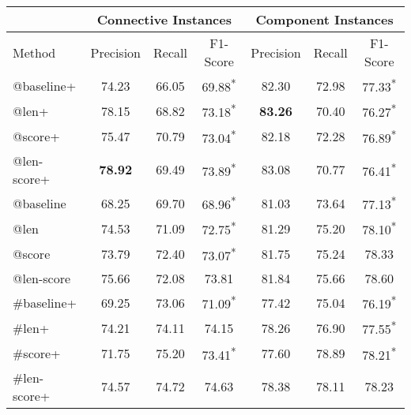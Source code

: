 \begin{table}[ht]
\centering
\begin{tabular}{|l|c|c|c|c|c|c|}
\hline
            & \multicolumn{3}{c|}{Connective Instances}                 & \multicolumn{3}{c|}{Component Instances}                  \\ \hline
Method      &     Precision &     Recall &     F1-Score                 &     Precision &     Recall &     F1-Score                 \\ \hline
@baseline+  &     74.23     &     66.05  &     69.88\textsuperscript{*} &     82.30     &     72.98  &     77.33\textsuperscript{*} \\ \hline
@len+       &     78.15     &     68.82  &     73.18\textsuperscript{*} & \bf 83.26     &     70.40  &     76.27\textsuperscript{*} \\ \hline
@score+     &     75.47     &     70.79  &     73.04\textsuperscript{*} &     82.18     &     72.28  &     76.89\textsuperscript{*} \\ \hline
@len-score+ & \bf 78.92     &     69.49  &     73.89\textsuperscript{*} &     83.08     &     70.77  &     76.41\textsuperscript{*} \\

\hhline{|=|=|=|=|=|=|=|}

@baseline   &     68.25     &     69.70  &     68.96\textsuperscript{*} &     81.03     &     73.64  &     77.13\textsuperscript{*} \\ \hline
@len        &     74.53     &     71.09  &     72.75\textsuperscript{*} &     81.29     &     75.20  &     78.10\textsuperscript{*} \\ \hline
@score      &     73.79     &     72.40  &     73.07\textsuperscript{*} &     81.75     &     75.24  &     78.33\textsuperscript{ } \\ \hline
@len-score  &     75.66     &     72.08  &     73.81\textsuperscript{ } &     81.84     &     75.66  &     78.60\textsuperscript{ } \\

\hhline{|=|=|=|=|=|=|=|}

\#baseline+ &     69.25     &     73.06  &     71.09\textsuperscript{*} &     77.42     &     75.04  &     76.19\textsuperscript{*} \\ \hline
\#len+      &     74.21     &     74.11  &     74.15\textsuperscript{ } &     78.26     &     76.90  &     77.55\textsuperscript{*} \\ \hline
\#score+    &     71.75     &     75.20  &     73.41\textsuperscript{*} &     77.60     &     78.89  &     78.21\textsuperscript{*} \\ \hline
\#len-score+&     74.57     &     74.72  &     74.63\textsuperscript{ } &     78.38     &     78.11  &     78.23\textsuperscript{ } \\


\end{tabular}
\end{table}
